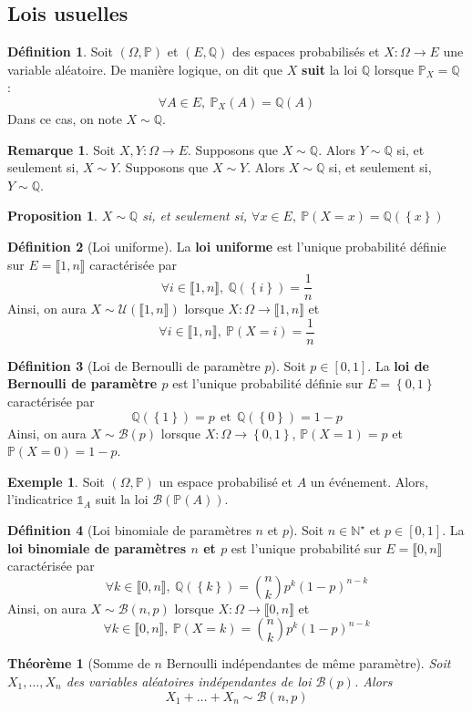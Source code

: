 \documentclass[french]{book}
\renewcommand{\P}{\mathbb{P}}
\newcommand{\N}{\mathbb{N}}
\newcommand{\Q}{\mathbb{Q}}
\newcommand{\st}{^\star}
\theoremstyle{plain}
\newtheorem{thm}{Théorème}[chapter]
\newtheorem{prop}{Proposition}[chapter]
\theoremstyle{definition}
\newtheorem{dfn}{Définition}[chapter]
\newtheorem{exa}{Exemple}[chapter]
\newtheorem{rmq}{Remarque}[chapter]
\theoremstyle{remark}
\begin{document}
\subsection{Lois usuelles}
\begin{dfn}
	Soit $(\Omega,\P)$ et $(E,\Q)$ des espaces probabilisés et $X:\Omega\rightarrow E$ une variable aléatoire. De manière logique, on dit que $X$ \textbf{suit} la loi $\Q$ lorsque $\P_X=\Q$ : $$\forall A\in E, \ \P_X(A)=\Q(A)$$ Dans ce cas, on note $X\sim \Q$.
\end{dfn}
\begin{rmq} Soit $X,Y:\Omega\rightarrow E$. Supposons que $X\sim \Q$. Alors $Y\sim \Q$ si, et seulement si, $X\sim Y$. Supposons que $X\sim Y$. Alors $X\sim \Q$ si, et seulement si, $Y\sim \Q$. \end{rmq}
\begin{prop}
	$X\sim \Q$ si, et seulement si, $\forall x\in E, \ \P(X=x)=\Q(\left\{x\right\})$
\end{prop}
\begin{dfn}[Loi uniforme]
	La \textbf{loi uniforme} est l'unique probabilité définie sur $E=\llbracket1,n\rrbracket$ caractérisée par $$\forall i\in\llbracket1,n\rrbracket, \ \Q(\left\{i\right\})=\frac1n$$ Ainsi, on aura $X\sim\mathcal{U}(\llbracket1,n\rrbracket)$ lorsque $X:\Omega\rightarrow\llbracket1,n\rrbracket$ et $$\forall i\in\llbracket1,n\rrbracket, \ \P(X=i)=\frac1n$$
\end{dfn}
\begin{dfn}[Loi de Bernoulli de paramètre $p$]
	Soit $p\in[0,1]$. La \textbf{loi de Bernoulli de paramètre $p$} est l'unique probabilité définie sur $E=\left\{0,1\right\}$ caractérisée par $$\Q(\left\{1\right\})=p \ \ \text{et} \ \ \Q(\left\{0\right\})=1-p$$ Ainsi, on aura $X\sim\mathcal{B}(p)$ lorsque $X:\Omega\rightarrow\left\{0,1\right\}$, $\P(X=1)=p$ et $\P(X=0)=1-p$.
\end{dfn}
\begin{exa}
	Soit $(\Omega,\P)$ un espace probabilisé et $A$ un événement. Alors, l'indicatrice $\mathds{1}_A$ suit la loi $\mathcal{B}(\P(A))$.
\end{exa}
\begin{dfn}[Loi binomiale de paramètres $n$ et $p$]
	Soit $n\in\N\st$ et $p\in[0,1]$. La \textbf{loi binomiale de paramètres $n$ et $p$} est l'unique probabilité sur $E=\llbracket0,n\rrbracket$ caractérisée par $$\forall k \in\llbracket0,n\rrbracket, \ \Q(\left\{k\right\})=\binom{n}{k}p^k(1-p)^{n-k}$$ Ainsi, on aura $X\sim \mathcal{B}(n,p)$ lorsque $X:\Omega\rightarrow\llbracket0,n\rrbracket$ et $$\forall k \in\llbracket0,n\rrbracket,\ \P(X=k)=\binom{n}{k}p^k(1-p)^{n-k}$$
\end{dfn}
\begin{thm}[Somme de $n$ Bernoulli indépendantes de même paramètre]
	Soit $X_1,\ldots,X_n$ des variables aléatoires indépendantes de loi $\mathcal{B}(p)$. Alors $$X_1+\ldots+X_n \sim \mathcal{B}(n,p)$$
\end{thm}
\end{document}
